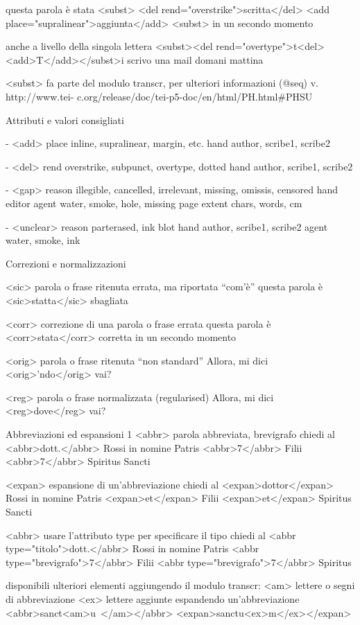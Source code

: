 questa parola è stata <subst>
<del rend="overstrike">scritta</del>
<add place="supralinear">aggiunta</add>
<subst> in un secondo momento

anche a livello della singola lettera
<subst><del rend="overtype">t<del><add>T</add></subst>i scrivo una
   mail domani mattina

   <subst> fa parte del modulo transcr, per ulteriori informazioni (@seq) v. http://www.tei- c.org/release/doc/tei-p5-doc/en/html/PH.html\#PHSU

Attributi e valori consigliati

- <add> 
place inline, supralinear, margin, etc.
hand author, scribe1, scribe2

- <del> 
rend overstrike, subpunct, overtype, dotted
hand author, scribe1, scribe2

- <gap>
reason illegible, cancelled, irrelevant, missing, omissis, censored 
hand editor
agent water, smoke, hole, missing page
extent chars, words, cm

- <unclear> 
reason parterased, ink blot 
hand author, scribe1, scribe2
agent water, smoke, ink

Correzioni e normalizzazioni

 <sic> parola o frase ritenuta errata, ma riportata “com’è”
questa parola è <sic>statta</sic> sbagliata

<corr> correzione di una parola o frase errata
questa parola è <corr>stata</corr> corretta in un
 secondo momento

<orig> parola o frase ritenuta “non standard” 
Allora, mi dici <orig>’ndo</orig> vai?

<reg> parola o frase normalizzata (regularised) Allora, mi dici <reg>dove</reg> vai?


Abbreviazioni ed espansioni 1 <abbr> parola abbreviata, brevigrafo
 chiedi al <abbr>dott.</abbr> Rossi
 in nomine Patris <abbr>7</abbr> Filii
 <abbr>7</abbr> Spiritus Sancti

<expan> espansione di un’abbreviazione chiedi al <expan>dottor</expan> Rossi
 in nomine Patris <expan>et</expan> Filii
 <expan>et</expan> Spiritus Sancti

 
<abbr> usare l’attributo type per specificare il tipo chiedi al <abbr type="titolo">dott.</abbr> Rossi
 in nomine Patris <abbr type="brevigrafo">7</abbr> Filii
 <abbr type="brevigrafo">7</abbr> Spiritus

disponibili ulteriori elementi aggiungendo il modulo transcr:
<am> lettere o segni di abbreviazione
<ex> lettere aggiunte espandendo un’abbreviazione
 <abbr>sanct<am>u~</am></abbr>
 <expan>sanctu<ex>m</ex></expan>

